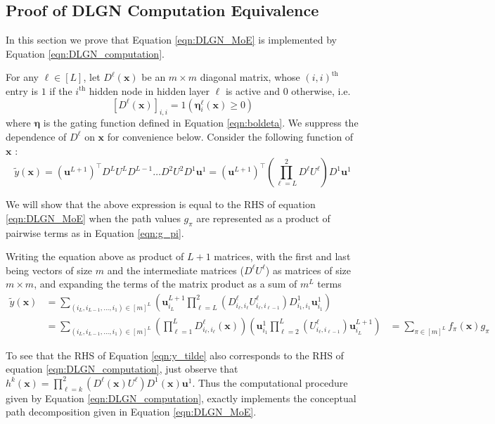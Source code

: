 \documentclass{article} %
\renewcommand{\tilde}{\widetilde}
\renewcommand{\>}{{\rightarrow}}
\renewcommand{\=}{\stackrel{\triangle}{=}}
\newcommand{\0}{{\mathbf 0}}
\newcommand{\x}{{\mathbf x}}
\newcommand{\bu}{{\mathbf u}}
\newcommand{\boldeta}{{\boldsymbol \eta}}
\begin{document}
\subsection{Proof of DLGN Computation Equivalence}

In this section we prove that Equation \ref{eqn:DLGN_MoE} is implemented by Equation \ref{eqn:DLGN_computation}. 

For any $\ell \in [L]$, let $D^\ell(\x)$ be an $m \times m$ diagonal matrix, whose $(i,i)^{\text{th}}$ entry is $1$ if the $i^{\text{th}}$ hidden node in hidden layer $\ell$ is active and $0$ otherwise, i.e. 
\[
[D^\ell(\x)]_{i,i} = 1(\boldeta^\ell_i(\x) \geq 0)
\]
where $\boldeta$ is the gating function defined in Equation \ref{eqn:boldeta}. We suppress the dependence of $D^\ell$ on $\x$ for convenience below. Consider the following function of $\x$ :
\begin{equation}
\tilde y(\x) = (\bu^{L+1})^\top D^L U^L D^{L-1} \ldots D^2 U^2 D^1 \bu^1 = (\bu^{L+1})^\top \left(\prod_{\ell=L}^2 D^\ell U^\ell \right) D^1 \bu^1
\label{eqn:y_tilde}
\end{equation}

We will show that the above expression is equal to the RHS of equation \ref{eqn:DLGN_MoE} when the path values $g_\pi$ are represented as a product of pairwise terms as in Equation \ref{eqn:g_pi}. 

Writing the equation above as product of $L+1$ matrices, with the first and last being vectors of size $m$ and the intermediate matrices ($D^\ell U^\ell$) as matrices of size $m \times m$, and expanding the terms of the matrix product as a sum of $m^L$ terms
\begin{align*}
\tilde y(\x) 
&= \sum_{(i_L, i_{L-1}, \ldots, i_1) \in [m]^L}  \left(\bu^{L+1}_{i_L} \prod_{\ell=L}^2 \left(D^\ell_{i_\ell, i_\ell}  U^\ell_{i_\ell, i_{\ell-1}} \right) D^1_{i_1,i_1} \bu^1_{i_1} \right) \\
&= \sum_{(i_L, i_{L-1}, \ldots, i_1) \in [m]^L} \left( \prod_{\ell=1}^L  
D^\ell_{i_\ell, i_\ell} (\x)  \right) \left( \bu^1_{i_1} \prod_{\ell=2}^L \left(U^\ell_{i_\ell, i_{\ell-1}} \right) \bu^{L+1}_{i_L} \right) 
&= \sum_{\pi \in [m]^L} f_\pi(\x) g_\pi 
\end{align*}

To see that the RHS of Equation \ref{eqn:y_tilde} also corresponds to the RHS of equation \ref{eqn:DLGN_computation}, just observe that $h^k(\x) = \prod_{\ell=k}^2 \left( D^\ell(\x) U^\ell \right) D^1(\x)\bu^1 $. Thus the computational procedure given by Equation \ref{eqn:DLGN_computation}, exactly implements the conceptual path decomposition given in Equation \ref{eqn:DLGN_MoE}.
\end{document}
